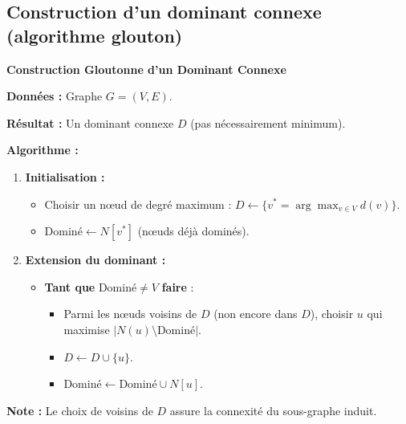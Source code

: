 \documentclass[12pt,a4paper]{article}
\begin{document}
\subsection{Construction d'un dominant connexe (algorithme glouton)}

\begin{algorithme}
\textbf{Construction Gloutonne d'un Dominant Connexe}

\textbf{Données :} Graphe $G = (V, E)$.

\textbf{Résultat :} Un dominant connexe $D$ (pas nécessairement minimum).

\textbf{Algorithme :}
\begin{enumerate}
    \item \textbf{Initialisation :}
    \begin{itemize}
        \item Choisir un nœud de degré maximum : $D \leftarrow \{v^* = \arg\max_{v \in V} d(v)\}$.
        \item $\text{Dominé} \leftarrow N[v^*]$ (nœuds déjà dominés).
    \end{itemize}
    \item \textbf{Extension du dominant :}
    \begin{itemize}
        \item \textbf{Tant que} $\text{Dominé} \neq V$ \textbf{faire} :
        \begin{itemize}
            \item Parmi les nœuds voisins de $D$ (non encore dans $D$), choisir $u$ qui
                  maximise $|N(u) \setminus \text{Dominé}|$.
            \item $D \leftarrow D \cup \{u\}$.
            \item $\text{Dominé} \leftarrow \text{Dominé} \cup N[u]$.
        \end{itemize}
    \end{itemize}
\end{enumerate}

\textbf{Note :} Le choix de voisins de $D$ assure la connexité du sous-graphe induit.
\end{algorithme}
\end{document}
